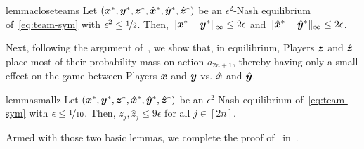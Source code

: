 \begin{restatable}{lemma}{closeteams}
    \label{lemma:close-teams}
    Let $({\bm{x}}^*, {\bm{y}}^*, {\bm{z}}^*, \hat{{\bm{x}}}^*, \hat{{\bm{y}}}^*, \hat{{\bm{z}}}^*)$ be an $\epsilon^2$-Nash equilibrium of~\eqref{eq:team-sym} with $\epsilon^2 \leq \nicefrac{1}{2}$. Then, $\| {\bm{x}}^* - {\bm{y}}^* \|_\infty \leq 2 \epsilon$ and $\| \hat{{\bm{x}}}^* - \hat{{\bm{y}}}^* \|_\infty \leq 2 \epsilon$.
\end{restatable}

Next, following the argument of~, we show that, in equilibrium, Players ${\bm{z}}$ and $\hat{{\bm{z}}}$ place most of their probability mass on action $a_{2n + 1}$, thereby having only a small effect on the game between Players ${\bm{x}}$ and ${\bm{y}}$ vs. $\hat{{\bm{x}}}$ and $\hat{{\bm{y}}}$.

\begin{restatable}{lemma}{smallz}
    \label{lemma:smallzteam}
    Let $({\bm{x}}^*, {\bm{y}}^*, {\bm{z}}^*, \hat{{\bm{x}}}^*, \hat{{\bm{y}}}^*, \hat{{\bm{z}}}^*)$ be an $\epsilon^2$-Nash equilibrium of~\eqref{eq:team-sym} with $\epsilon \leq \nicefrac{1}{10}$. Then, $z_j, \hat{z}_j \leq 9 \epsilon$ for all $j \in [2n]$.
\end{restatable}

Armed with those two basic lemmas, we complete the proof of~ in~.

